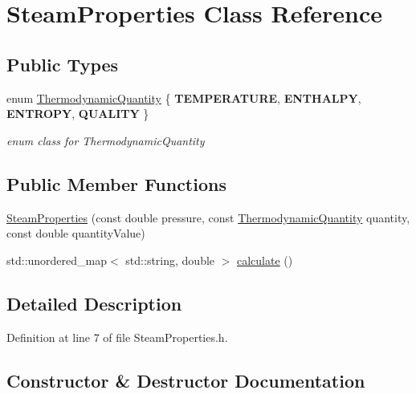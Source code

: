 \hypertarget{class_steam_properties}{}\section{Steam\+Properties Class Reference}
\label{class_steam_properties}
\subsection*{Public Types}
\begin{DoxyCompactItemize}
\item 
\mbox{\label{class_steam_properties_ae0294bedf7d178c2d8fb6aed0f62fbff}} 
enum \hyperlink{class_steam_properties_ae0294bedf7d178c2d8fb6aed0f62fbff}{Thermodynamic\+Quantity} \{ {\bfseries T\+E\+M\+P\+E\+R\+A\+T\+U\+RE}, 
{\bfseries E\+N\+T\+H\+A\+L\+PY}, 
{\bfseries E\+N\+T\+R\+O\+PY}, 
{\bfseries Q\+U\+A\+L\+I\+TY}
 \}\begin{DoxyCompactList}\small\item\em enum class for Thermodynamic\+Quantity \end{DoxyCompactList}
\end{DoxyCompactItemize}
\subsection*{Public Member Functions}
\begin{DoxyCompactItemize}
\item 
\hyperlink{class_steam_properties_a976e08ed0433943d469a8c2f75d2ac68}{Steam\+Properties} (const double pressure, const \hyperlink{class_steam_properties_ae0294bedf7d178c2d8fb6aed0f62fbff}{Thermodynamic\+Quantity} quantity, const double quantity\+Value)
\item 
std\+::unordered\+\_\+map$<$ std\+::string, double $>$ \hyperlink{class_steam_properties_a449e2da87adb5a207bc73ec90f87922a}{calculate} ()
\end{DoxyCompactItemize}


\subsection{Detailed Description}


Definition at line 7 of file Steam\+Properties.\+h.



\subsection{Constructor \& Destructor Documentation}
\mbox{\label{class_steam_properties_a976e08ed0433943d469a8c2f75d2ac68}} 
